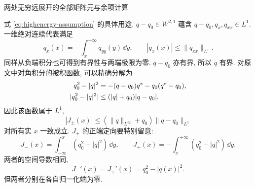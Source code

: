 \par\medskip\noindent 两处无穷远展开的全部矩阵元与余项计算\par
\par\smallskip\noindent 式 \eqref{eq:highenergy-assumption} 的具体用途.\quad
$q-q_0\in W^{2,1}$ 蕴含 $q-q_0,q_x,q_{xx}\in L^1$.
一维绝对连续代表满足
\begin{equation*}
q_x(x)=-\int_x^{+\infty}q_{yy}(y)\,\dd y,
\qquad
|q_x(x)|\le\|q_{xx}\|_{L^1}.
\end{equation*}
同样从负端积分也可得到有界性与两端极限为零.
$q-q_0$ 亦有界, 所以 $q$ 有界.
对原文中对角积分的被积函数, 可以精确分解为
\begin{align*}
q_0^2-|q|^2
&=-(q-q_0){q}^{*}-q_0({q}^{*}-q_0),\\
|q_0^2-|q|^2|
&\le(|q|+q_0)|q-q_0|.
\end{align*}
因此该函数属于 $L^1$,
\begin{equation*}
|J_\pm(x)|\le(\|q\|_{L^\infty}+q_0)\|q-q_0\|_{L^1}
\end{equation*}
对所有实 $x$ 一致成立.
$J_+$ 的正端定向要特别留意:
\begin{equation*}
J_-(x)=\int_{-\infty}^{x}(q_0^2-|q|^2)\,\dd y,
\qquad
J_+(x)=-\int_x^{+\infty}(q_0^2-|q|^2)\,\dd y.
\end{equation*}
两者的空间导数相同,
\begin{equation*}
J_-'(x)=J_+'(x)=q_0^2-|q(x)|^2.
\end{equation*}
但两者分别在各自归一化端为零.

